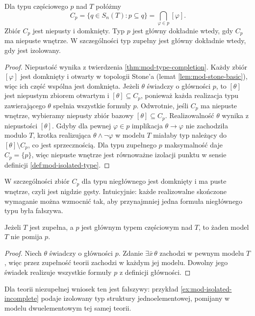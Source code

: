 \begin{lemat}
\label{lem:mod-ott-interior}
Dla typu częściowego $p$ nad $T$ połóżmy
\[
C_p=\{q\in S_n(T):p\subseteq q\}
=\bigcap_{\varphi\in p}[\varphi].
\]
Zbiór $C_p$ jest niepusty i domknięty.
Typ $p$ jest główny dokładnie wtedy, gdy $C_p$
ma niepuste wnętrze. W szczególności typ zupełny
jest główny dokładnie wtedy, gdy jest izolowany.
\end{lemat}
\begin{proof}
Niepustość wynika z twierdzenia
\ref{thm:mod-type-completion}. Każdy zbiór
$[\varphi]$ jest domknięty i otwarty w topologii
Stone'a (lemat \ref{lem:mod-stone-basic}), więc
ich część wspólna jest domknięta.
Jeżeli $\theta$ świadczy o główności $p$, to
$[\theta]$ jest niepustym zbiorem otwartym i
$[\theta]\subseteq C_p$, ponieważ każda realizacja
typu zawierającego $\theta$ spełnia wszystkie
formuły $p$. Odwrotnie, jeśli $C_p$ ma niepuste
wnętrze, wybieramy niepusty zbiór bazowy
$[\theta]\subseteq C_p$. Realizowalność $\theta$
wynika z niepustości $[\theta]$.
Gdyby dla pewnej $\varphi\in p$ implikacja
$\theta\to\varphi$ nie zachodziła modulo $T$,
krotka realizująca $\theta\land\neg\varphi$
w modelu $T$ miałaby typ należący do
$[\theta]\setminus C_p$, co jest sprzecznością.
Dla typu zupełnego $p$ maksymalność daje
$C_p=\{p\}$, więc niepuste wnętrze jest
równoważne izolacji punktu w sensie definicji
\ref{def:mod-isolated-type}.
\end{proof}

W szczególności zbiór $C_p$ dla typu niegłównego
jest domknięty i ma puste wnętrze, czyli jest
nigdzie gęsty. Intuicyjnie: każde realizowalne
skończone wymaganie można wzmocnić tak, aby
przynajmniej jedna formuła niegłównego typu
była fałszywa.

\begin{lemat}
\label{lem:mod-ott-principal-unavoidable}
Jeżeli $T$ jest zupełna, a $p$ jest głównym typem
częściowym nad $T$, to żaden model $T$ nie pomija $p$.
\end{lemat}
\begin{proof}
Niech $\theta$ świadczy o główności $p$.
Zdanie $\exists\bar x\,\theta$ zachodzi w pewnym
modelu $T$, więc przez zupełność teorii zachodzi
w każdym jej modelu. Dowolny jego świadek
realizuje wszystkie formuły $p$ z definicji
główności.
\end{proof}

Dla teorii niezupełnej wniosek ten jest fałszywy:
przykład \ref{ex:mod-isolated-incomplete} podaje
izolowany typ struktury jednoelementowej, pomijany
w modelu dwuelementowym tej samej teorii.

